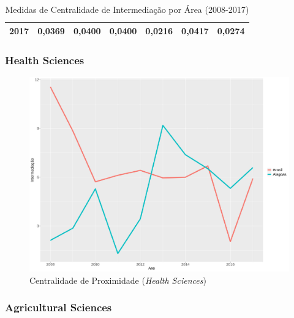 \begin{table}[H]
\begin{tabular}{|c|l|l|l|l|l|l|}
		2017            & 0,0369                                                 & 0,0400                                                    & 0,0400                                                       & 0,0216                                                    & 0,0417                                                      & 0,0274                                                      \\ \hline
	\end{tabular}
\caption{Medidas de Centralidade de Intermediação por Área (2008-2017)}
\label{betweeness-tab}
\end{table}

\subsubsection{Health Sciences}

\begin{figure}[H]
	\centering
	\includegraphics[scale=0.4]{Imagens/graf-linha-betweeness-br-al.pdf}
	\caption{Centralidade de Proximidade (\textit{Health Sciences})}
	\label{between-health-1}
\end{figure}

\subsubsection{Agricultural Sciences}

